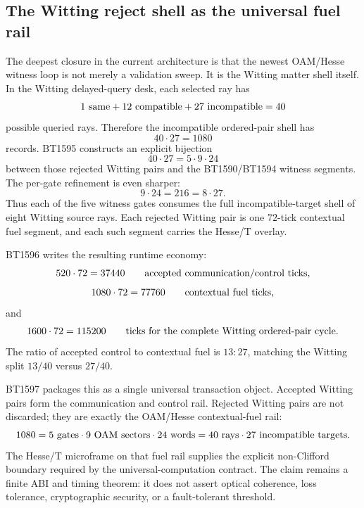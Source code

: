 \subsection{The Witting reject shell as the universal fuel rail}
\label{sec:bt1595-bt1597-witting-fuel-object}

The deepest closure in the current architecture is that the newest
OAM/Hesse witness loop is not merely a validation sweep.  It is the Witting
matter shell itself.  In the Witting delayed-query desk, each selected ray has
\[
  1\ {\rm same}+12\ {\rm compatible}+27\ {\rm incompatible}=40
\]
possible queried rays.  Therefore the incompatible ordered-pair shell has
\[
  40\cdot 27=1080
\]
records.  BT1595 constructs an explicit bijection
\[
  40\cdot27
  =
  5\cdot9\cdot24
\]
between those rejected Witting pairs and the BT1590/BT1594 witness segments.
The per-gate refinement is even sharper:
\[
  9\cdot24=216=8\cdot27.
\]
Thus each of the five witness gates consumes the full incompatible-target shell
of eight Witting source rays.  Each rejected Witting pair is one \(72\)-tick
contextual fuel segment, and each such segment carries the Hesse/T overlay.

BT1596 writes the resulting runtime economy:
\[
  520\cdot72=37440
  \qquad\hbox{accepted communication/control ticks,}
\]
\[
  1080\cdot72=77760
  \qquad\hbox{contextual fuel ticks,}
\]
and
\[
  1600\cdot72=115200
  \qquad\hbox{ticks for the complete Witting ordered-pair cycle.}
\]
The ratio of accepted control to contextual fuel is \(13:27\), matching the
Witting split \(13/40\) versus \(27/40\).

BT1597 packages this as a single universal transaction object.  Accepted Witting
pairs form the communication and control rail.  Rejected Witting pairs are not
discarded; they are exactly the OAM/Hesse contextual-fuel rail:
\[
  1080
  =5\ {\rm gates}\cdot9\ {\rm OAM\ sectors}\cdot24\ {\rm words}
  =40\ {\rm rays}\cdot27\ {\rm incompatible\ targets}.
\]
The Hesse/T microframe on that fuel rail supplies the explicit non-Clifford
boundary required by the universal-computation contract.  The claim remains a
finite ABI and timing theorem: it does not assert optical coherence, loss
tolerance, cryptographic security, or a fault-tolerant threshold.
